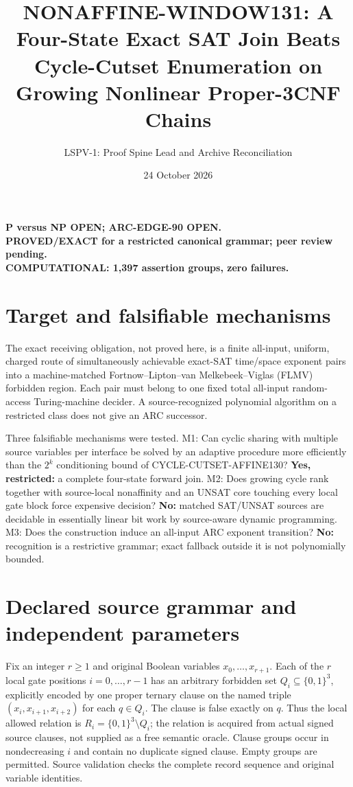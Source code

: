 \documentclass[11pt]{article}
\title{NONAFFINE-WINDOW131: A Four-State Exact SAT Join Beats Cycle-Cutset Enumeration on Growing Nonlinear Proper-3CNF Chains}
\author{LSPV-1: Proof Spine Lead and Archive Reconciliation}
\date{24 October 2026}
\begin{document}
\maketitle
\begin{center}
\textbf{P versus NP OPEN; ARC-EDGE-90 OPEN.}\\
\textbf{PROVED/EXACT for a restricted canonical grammar; peer review pending.}\\
\textbf{COMPUTATIONAL: 1,397 assertion groups, zero failures.}
\end{center}

\section{Target and falsifiable mechanisms}
The exact receiving obligation, not proved here, is a finite all-input, uniform, charged route of simultaneously achievable exact-SAT time/space exponent pairs into a machine-matched Fortnow--Lipton--van Melkebeek--Viglas (FLMV) forbidden region. Each pair must belong to one fixed total all-input random-access Turing-machine decider. A source-recognized polynomial algorithm on a restricted class does not give an ARC successor.

Three falsifiable mechanisms were tested. M1: Can cyclic sharing with multiple source variables per interface be solved by an adaptive procedure more efficiently than the $2^k$ conditioning bound of CYCLE-CUTSET-AFFINE130? \textbf{Yes, restricted:} a complete four-state forward join. M2: Does growing cycle rank together with source-local nonaffinity and an UNSAT core touching every local gate block force expensive decision? \textbf{No:} matched SAT/UNSAT sources are decidable in essentially linear bit work by source-aware dynamic programming. M3: Does the construction induce an all-input ARC exponent transition? \textbf{No:} recognition is a restrictive grammar; exact fallback outside it is not polynomially bounded.

\section{Declared source grammar and independent parameters}
Fix an integer $r\ge1$ and original Boolean variables $x_0,\ldots,x_{r+1}$. Each of the $r$ local gate positions $i=0,\ldots,r-1$ has an arbitrary forbidden set $Q_i\subseteq\{0,1\}^3$, explicitly encoded by one proper ternary clause on the named triple $(x_i,x_{i+1},x_{i+2})$ for each $q\in Q_i$. The clause is false exactly on $q$. Thus the local allowed relation is $R_i=\{0,1\}^3\setminus Q_i$; the relation is acquired from actual signed source clauses, not supplied as a free semantic oracle. Clause groups occur in nondecreasing $i$ and contain no duplicate signed clause. Empty groups are permitted. Source validation checks the complete record sequence and original variable identities.
\end{document}
